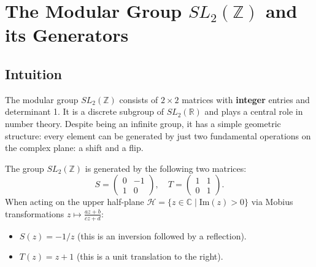 \section{The Modular Group $SL_2(\mathbb{Z})$ and its Generators}

\subsection{Intuition}
The modular group $SL_2(\mathbb{Z})$ consists of $2 \times 2$ matrices with \textbf{integer} entries and determinant 1. It is a discrete subgroup of $SL_2(\mathbb{R})$ and plays a central role in number theory. Despite being an infinite group, it has a simple geometric structure: every element can be generated by just two fundamental operations on the complex plane: a shift and a flip.

\begin{definition}
The group $SL_2(\mathbb{Z})$ is generated by the following two matrices:
\[ S = \begin{pmatrix} 0 & -1 \\ 1 & 0 \end{pmatrix}, \quad T = \begin{pmatrix} 1 & 1 \\ 0 & 1 \end{pmatrix}. \]
When acting on the upper half-plane $\mathcal{H} = \{z \in \mathbb{C} \mid \text{Im}(z) > 0\}$ via Mobius transformations $z \mapsto \frac{az+b}{cz+d}$:
\begin{itemize}
    \item $S(z) = -1/z$ (this is an inversion followed by a reflection).
    \item $T(z) = z+1$ (this is a unit translation to the right).
\end{itemize}
\end{definition}


